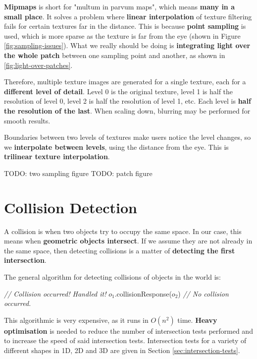 \documentclass{article}
\begin{document}
\textbf{Mipmaps} is short for "multum in parvum maps", which means \textbf{many in a small place}. It solves a problem where \textbf{linear interpolation} of texture filtering fails for certain textures far in the distance. This is because \textbf{point sampling} is used, which is more sparse as the texture is far from the eye (shown in Figure \ref{fig:sampling-issues}). What we really should be doing is \textbf{integrating light over the whole patch} between one sampling point and another, as shown in \ref{fig:light-over-patches}.

Therefore, multiple texture images are generated for a single texture, each for a \textbf{different level of detail}. Level 0 is the original texture, level 1 is half the resolution of level 0, level 2 is half the resolution of level 1, etc. Each level is \textbf{half the resolution of the last}. When scaling down, blurring may be performed for smooth results.

Boundaries between two levels of textures make users notice the level changes, so we \textbf{interpolate between levels}, using the distance from the eye. This is \textbf{trilinear texture interpolation}.

TODO: two sampling figure
TODO: patch figure

\section{Collision Detection}

A collision is when two objects try to occupy the same space. In our case, this means when \textbf{geometric objects intersect}. If we assume they are not already in the same space, then detecting collisions is a matter of \textbf{detecting the first intersection}.

The general algorithm for detecting collisions of objects in the world is:
\begin{algorithmic}[1]
			\STATE \textit{// Collision occurred! Handled it!}
			\STATE $o_1$.collisionResponse($o_2$)
		\ELSE
			\STATE \textit{// No collision occurred.}
		\ENDIF
	\ENDFOR
\ENDFOR
\end{algorithmic}

This algorithmic is very expensive, as it runs in $O(n^2)$ time. \textbf{Heavy optimisation} is needed to reduce the number of intersection tests performed and to increase the speed of said intersection tests. Intersection tests for a variety of different shapes in 1D, 2D and 3D are given in Section \ref{sec:intersection-tests}.
\end{document}
